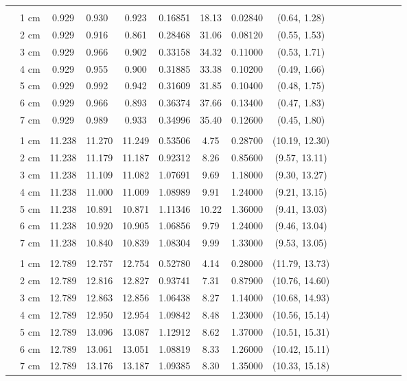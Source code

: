 \documentclass[a4paper 12pt]{article}
\numberwithin{equation}{section}
\begin{document}
\begin{small}
\begin{table}[h!]
\begin{footnotesize}
\begin{tabular}{clclclclclclclcl}
\raisebox{1ex}{\bf age 2} &  \\ [1.0ex]
&   1 cm & 0.929 &    0.930  & 0.923 &   0.16851& 18.13 & 0.02840 & (0.64, 1.28)\\
&   2 cm & 0.929 &    0.916  & 0.861 &   0.28468& 31.06 & 0.08120 & (0.55, 1.53) \\
&   3 cm & 0.929 &    0.966  & 0.902 &   0.33158& 34.32 & 0.11000 & (0.53, 1.71)\\
&   4 cm & 0.929 &    0.955  & 0.900 &   0.31885& 33.38 & 0.10200 & (0.49, 1.66)\\
&   5 cm & 0.929 &    0.992  & 0.942 &   0.31609& 31.85 & 0.10400 & (0.48, 1.75)\\
&   6 cm & 0.929 &    0.966  & 0.893 &   0.36374& 37.66 & 0.13400 & (0.47, 1.83)\\
&   7 cm & 0.929 &    0.989  & 0.933 &   0.34996& 35.40 & 0.12600 & (0.45, 1.80)\\[1.2ex]

 \raisebox{1ex}{\bf age 3} \\ [1.0ex]
&   1 cm & 11.238  &  11.270 & 11.249 &  0.53506& 4.75  & 0.28700 & (10.19, 12.30)\\
&   2 cm & 11.238  &  11.179 & 11.187 &  0.92312& 8.26  & 0.85600 & (9.57, 13.11)\\
&   3 cm & 11.238  &  11.109 & 11.082 &  1.07691& 9.69  & 1.18000 & (9.30, 13.27)\\
&   4 cm & 11.238  &  11.000 & 11.009 &  1.08989& 9.91  & 1.24000 & (9.21, 13.15)\\
&   5 cm & 11.238  &  10.891 & 10.871 &  1.11346& 10.22 & 1.36000 & (9.41, 13.03)\\
&   6 cm & 11.238  &  10.920 & 10.905 &  1.06856& 9.79  & 1.24000 & (9.46, 13.04)\\
&   7 cm & 11.238  &  10.840 & 10.839 &  1.08304& 9.99  & 1.33000 & (9.53, 13.05)\\[1.5ex]

 \raisebox{1ex}{\bf age 4} &  \\ [1.0ex]
 &  1 cm & 12.789 &   12.757 & 12.754 &  0.52780& 4.14 & 0.28000 & (11.79, 13.73) \\
 &  2 cm & 12.789 &   12.816 & 12.827 &  0.93741& 7.31 & 0.87900 & (10.76, 14.60) \\
 &  3 cm & 12.789 &   12.863 & 12.856 &  1.06438& 8.27 & 1.14000 & (10.68, 14.93) \\
 &  4 cm & 12.789 &   12.950 & 12.954 &  1.09842& 8.48 & 1.23000 & (10.56, 15.14) \\
 &  5 cm & 12.789 &   13.096 & 13.087 &  1.12912& 8.62 & 1.37000 & (10.51, 15.31) \\
 &  6 cm & 12.789 &   13.061 & 13.051 &  1.08819& 8.33 & 1.26000 & (10.42, 15.11) \\
 &  7 cm & 12.789 &   13.176 & 13.187 &  1.09385& 8.30 & 1.35000 & (10.33, 15.18) \\[1.2ex]


\end{tabular}
\end{footnotesize}
\end{table}
\end{small}
\end{document}
